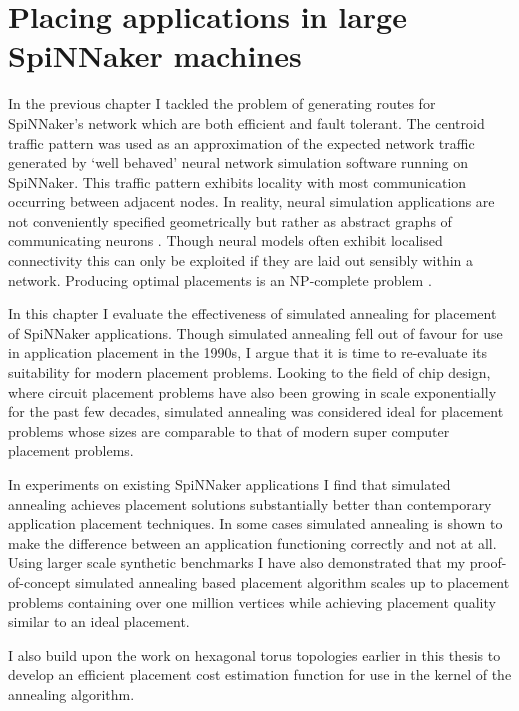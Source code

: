 \chapter{Placing applications in large SpiNNaker machines}
	
	\label{sec:placement}
	
	In the previous chapter I tackled the problem of generating routes for
	SpiNNaker's network which are both efficient and fault tolerant. The centroid
	traffic pattern was used as an approximation of the expected network traffic
	generated by `well behaved' neural network simulation software running on
	SpiNNaker. This traffic pattern exhibits locality with most communication
	occurring between adjacent nodes.  In reality, neural simulation applications
	are not conveniently specified geometrically but rather as abstract graphs of
	communicating neurons \cite{davison08,eliasmith04}. Though neural models
	often exhibit localised connectivity this can only be exploited if they are
	laid out sensibly within a network. Producing optimal placements is an
	NP-complete problem \cite{hoefler11}.
	
	In this chapter I evaluate the effectiveness of simulated annealing
	\cite{kirkpatrick83} for placement of SpiNNaker applications. Though
	simulated annealing fell out of favour for use in application placement in
	the 1990s, I argue that it is time to re-evaluate its suitability for modern
	placement problems. Looking to the field of chip design, where circuit
	placement problems have also been growing in scale exponentially for the past
	few decades, simulated annealing was considered ideal for placement problems
	whose sizes are comparable to that of modern super computer placement
	problems.
	
	In experiments on existing SpiNNaker applications I find that simulated
	annealing achieves placement solutions substantially better than contemporary
	application placement techniques. In some cases simulated annealing is shown
	to make the difference between an application functioning correctly and not
	at all. Using larger scale synthetic benchmarks I have also demonstrated that
	my proof-of-concept simulated annealing based placement algorithm scales up
	to placement problems containing over one million vertices while achieving
	placement quality similar to an ideal placement.
	
	I also build upon the work on hexagonal torus topologies earlier in this
	thesis to develop an efficient placement cost estimation function for use in
	the kernel of the annealing algorithm.
	
